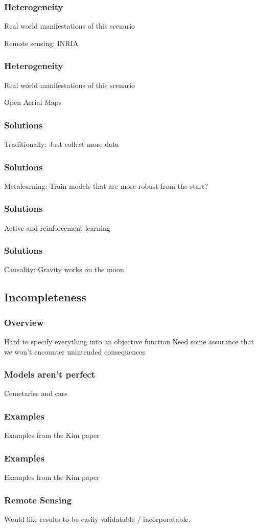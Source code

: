 \documentclass[10pt,mathserif]{beamer}
\begin{document}
\begin{frame}
  \frametitle{Heterogeneity}
  Real world manifestations of this scenario

  Remote sensing: INRIA
\end{frame}

\begin{frame}
  \frametitle{Heterogeneity}
  Real world manifestations of this scenario

  Open Aerial Maps
\end{frame}

\begin{frame}[]
  \frametitle{Solutions}
  Traditionally: Just collect more data
\end{frame}

\begin{frame}[]
  \frametitle{Solutions}
  Metalearning: Train models that are more robust from the start?
\end{frame}

\begin{frame}[]
  \frametitle{Solutions}
  Active and reinforcement learning
\end{frame}

\begin{frame}[]
  \frametitle{Solutions}
  Causality: Gravity works on the moon
\end{frame}

\subsection{Incompleteness}
\label{subsec:label}

\begin{frame}
  \frametitle{Overview}
  Hard to specify everything into an objective function
  Need some assurance that we won't encounter unintended consequences
\end{frame}

\begin{frame}
  \frametitle{Models aren't perfect}
 Cemetaries and cars 
\end{frame}

\begin{frame}
  \frametitle{Examples}
  Examples from the Kim paper
\end{frame}

\begin{frame}
  \frametitle{Examples}
  Examples from the Kim paper
\end{frame}

\begin{frame}
  \frametitle{Remote Sensing}
  Would like results to be easily validatable / incorporatable.
\end{frame}
\end{document}
